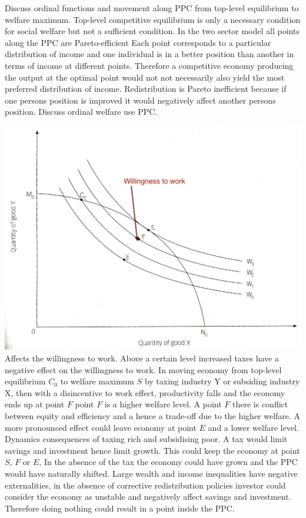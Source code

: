 \documentclass[12pt]{examnotes}
\begin{document}
\ra Discuss ordinal functions and movement along PPC from top-level equilibrium to welfare maximum.
\ra Top-level competitive equilibrium is only a necessary condition for social welfare but not a sufficient condition.
\ra In the two sector model all points along the PPC are Pareto-efficient
\ra Each point corresponds to a particular distribution of income and one individual is in a better position than another in terms of income at different points.
\ra Therefore a competitive economy producing the output at the optimal point would not not necessarily also yield the most preferred distribution of income.
\ra Redistribution is Pareto inefficient because if one persons position is improved it would negatively affect another persons position.
\ra Discuss ordinal welfare use PPC.

\includegraphics[scale=0.3]{./imgs/55.jpg}
 Affects the willingness to work.
\rna Above a certain level increased taxes have a negative effect on the willingness to work.
\rna In moving economy from top-level equilibrium $C_0$ to welfare maximum $S$ by taxing industry Y or subsiding industry X, then with a disincentive to work effect, productivity falls and the economy ends up at point $F$
\rna point $F$ is a higher welfare level. 
\rna A point $F$ there is conflict between equity and efficiency and a hence a trade-off due to the higher welfare.
\rna A more pronounced effect could leave economy at point $E$ and a lower welfare level.
 Dynamics consequences of taxing rich and subsidising poor.
\rna A tax would limit savings and investment hence limit growth. This could keep the economy at point $S$, $F$ or $E$, 
\rna In the absence of the tax the economy could have grown and the PPC would have naturally shifted.
\rna Large wealth and income inequalities have negative externalities, in the absence of corrective redistribution policies investor could consider the economy as unstable and negatively affect savings and investment. Therefore doing nothing could result in a point inside the PPC.
\end{document}
